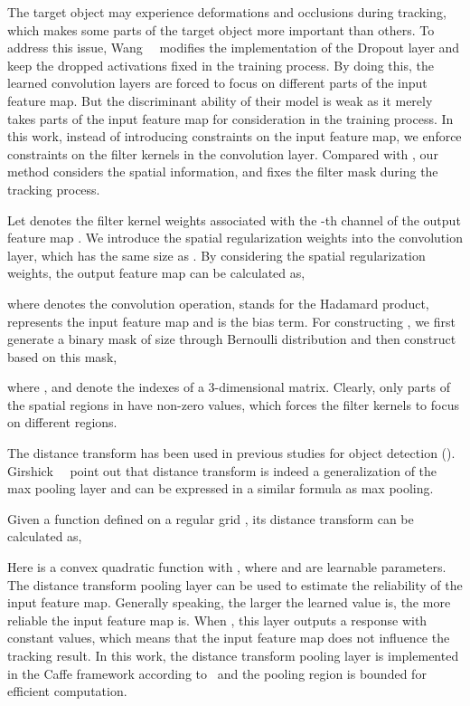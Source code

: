 \documentclass[10pt,twocolumn,letterpaper]{article}
\begin{document}
The target object may experience deformations and occlusions during tracking,
which makes some parts of the target object more important than others.
To address this issue, Wang~\etal~\cite{wang2016stct} modifies the implementation
of the Dropout layer and keep the dropped activations fixed in the training process.
By doing this, the learned convolution layers are forced to focus on different parts
of the input feature map.
But the discriminant ability of their model is weak as it merely takes parts of the
input feature map for consideration in the training process.
In this work, instead of introducing constraints on the input feature map, we enforce
constraints on the filter kernels in the convolution layer. Compared with \cite{wan2013regularization},
our method considers the spatial information, and fixes the filter mask during the tracking process.


Let  denotes the filter kernel weights
associated with the -th channel of the output feature map . We introduce the
spatial regularization weights  into the convolution layer, which has the same
size as . By considering the spatial regularization weights, the output feature
map  can be calculated as,

where  denotes the convolution operation,  stands for the Hadamard product,
 represents the input feature map and  is the bias term.
For constructing , we first generate a binary mask  of size
 through Bernoulli distribution  and then construct 
based on this mask,

where ,  and  denote the indexes of a 3-dimensional matrix. Clearly, only parts
of the spatial regions in  have non-zero values, which forces the filter kernels
to focus on different regions.

\vspace{1mm}
 The distance transform has been used
in previous studies for object detection (\cite{felzenszwalb2010object,savalle2014deformable}).
Girshick~\etal~\cite{girshick2015deformable} point out that distance transform is indeed a
generalization of the max pooling layer and can be expressed in a similar formula as max pooling.

Given a function  defined on a regular grid , its distance transform can be
calculated as,

Here  is a convex quadratic function with ,
where  and  are learnable parameters. The distance transform pooling layer
can be used to estimate the reliability of the input feature map. Generally speaking,
the larger the learned value  is, the more reliable the input feature map is.
When , this layer outputs a response with constant values, which means
that the input feature map does not influence the tracking result. In this work, the distance
transform pooling layer is implemented in the Caffe framework according
to~\cite{goodfellow2013maxout} and the pooling region is bounded for efficient computation.
\end{document}
